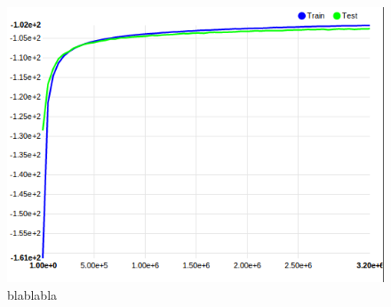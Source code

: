 \begin{figure}
	\includegraphics[scale=0.1]{images/MNIST_28_conv_nocuda.png}
	\caption{blablabla}
	\label{label1}
\end{figure}

